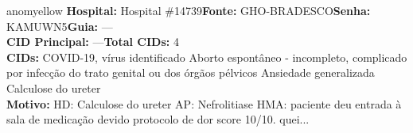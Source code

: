 \documentclass[a4paper,10pt]{article}
\begin{document}
\begin{anomalycard}[Interna\c{c}\~{a}o \#120465 | Pac. \#99862 | MODERADO (z=2.09) | LOS: 2d | 09/03/2026\,$\to$\,11/03/2026]{anomyellow}
\textbf{Hospital:} Hospital \#14739\quad \textbf{Fonte:} GHO-BRADESCO\quad \textbf{Senha:} KAMUWN5\quad \textbf{Guia:} ---\\

\textbf{CID Principal:} {\small ---}\quad\textbf{Total CIDs:} 4\\

\textbf{CIDs:} {\scriptsize COVID-19, vírus identificado \textbar{} Aborto espontâneo - incompleto, complicado por infecção do trato genital ou dos órgãos pélvicos \textbar{} Ansiedade generalizada \textbar{} Calculose do ureter}\\

\textbf{Motivo:} {\scriptsize HD: Calculose do ureter AP: Nefrolitiase HMA: paciente deu entrada à sala de medicação devido protocolo de dor score 10/10. quei...}\\



\end{anomalycard}
\end{document}
